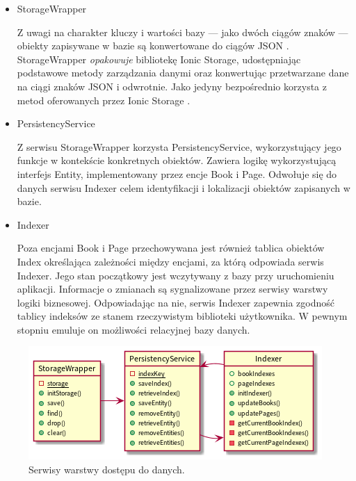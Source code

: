 \begin{itemize}
	\item StorageWrapper

	      Z uwagi na charakter kluczy i wartości bazy — jako dwóch ciągów znaków — obiekty zapisywane w bazie są
	      konwertowane do ciągów JSON \cite{json}. StorageWrapper \textit{opakowuje} bibliotekę Ionic Storage, udostępniając podstawowe
	      metody zarządzania danymi oraz konwertując przetwarzane dane na ciągi znaków JSON i odwrotnie.
	      Jako jedyny bezpośrednio korzysta z metod oferowanych przez Ionic Storage \cite{storage}.
	\item PersistencyService

	      Z serwisu StorageWrapper korzysta PersistencyService,
	      wykorzystujący jego funkcje w kontekście konkretnych obiektów.
	      Zawiera logikę wykorzystującą interfejs Entity, implementowany przez encje Book i Page. Odwołuje się do danych
	      serwisu Indexer celem identyfikacji i lokalizacji obiektów zapisanych w bazie.
	\item Indexer

	      Poza encjami Book i Page przechowywana jest również tablica obiektów Index określająca
	      zależności między encjami, za którą odpowiada serwis Indexer.
	      Jego stan początkowy jest wczytywany z bazy przy uruchomieniu aplikacji.
	      Informacje o zmianach są sygnalizowane przez serwisy warstwy logiki biznesowej.
	      Odpowiadając na nie, serwis Indexer zapewnia zgodność tablicy indeksów ze stanem rzeczywistym
	      biblioteki użytkownika. W pewnym stopniu emuluje on możliwości relacyjnej bazy danych.
\end{itemize}

\begin{figure}[H]
	\begin{center}
		\includegraphics[scale=0.9]{media/PersistencyLayer.png}
	\end{center}
	\caption{Serwisy warstwy dostępu do danych.}
	\label{rys:persistency-layer}
\end{figure}

